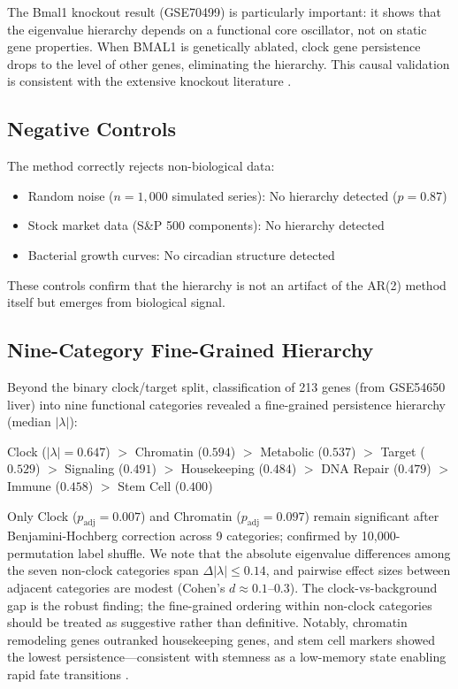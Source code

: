 \documentclass[11pt,letterpaper]{article}
\begin{document}
The Bmal1 knockout result (GSE70499) is particularly important: it shows that the eigenvalue hierarchy depends on a functional core oscillator, not on static gene properties. When BMAL1 is genetically ablated, clock gene persistence drops to the level of other genes, eliminating the hierarchy. This causal validation is consistent with the extensive knockout literature \citep{bunger2000mop3, kondratov2006early}.

\subsection{Negative Controls}

The method correctly rejects non-biological data:
\begin{itemize}
\item Random noise ($n = 1{,}000$ simulated series): No hierarchy detected ($p = 0.87$)
\item Stock market data (S\&P 500 components): No hierarchy detected
\item Bacterial growth curves: No circadian structure detected
\end{itemize}

These controls confirm that the hierarchy is not an artifact of the AR(2) method itself but emerges from biological signal.

\subsection{Nine-Category Fine-Grained Hierarchy}

Beyond the binary clock/target split, classification of 213 genes (from GSE54650 liver) into nine functional categories revealed a fine-grained persistence hierarchy (median $|\lambda|$):

Clock ($|\lambda|=0.647$) $>$ Chromatin ($0.594$) $>$ Metabolic ($0.537$) $>$ Target ($0.529$) $>$ Signaling ($0.491$) $>$ Housekeeping ($0.484$) $>$ DNA Repair ($0.479$) $>$ Immune ($0.458$) $>$ Stem Cell ($0.400$)

Only Clock ($p_{\mathrm{adj}} = 0.007$) and Chromatin ($p_{\mathrm{adj}} = 0.097$) remain significant after Benjamini-Hochberg correction across 9 categories; confirmed by 10,000-permutation label shuffle. We note that the absolute eigenvalue differences among the seven non-clock categories span $\Delta|\lambda| \leq 0.14$, and pairwise effect sizes between adjacent categories are modest (Cohen's $d \approx 0.1$--$0.3$). The clock-vs-background gap is the robust finding; the fine-grained ordering within non-clock categories should be treated as suggestive rather than definitive. Notably, chromatin remodeling genes outranked housekeeping genes, and stem cell markers showed the lowest persistence---consistent with stemness as a low-memory state enabling rapid fate transitions \citep{waddington1957strategy, moris2016transition}.
\end{document}
